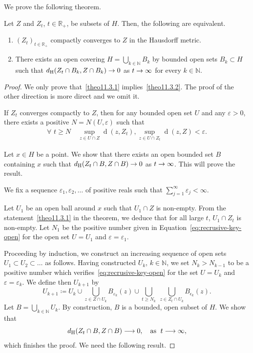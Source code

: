 \documentclass[AHL,Unicode,longabstracts]{cedram}
\DeclareMathOperator{\dist}{d}
\newcommand{\R}{\mathbb{R}}
\newcommand{\N}{\mathbb{N}}
\newcommand{\hdist}{d_{\mathrm{H}}}
\renewcommand*{\to}{\mathchoice{\longrightarrow}{\rightarrow}{\rightarrow}{\rightarrow}}
\let\oldforall\forall
\renewcommand*{\forall}{\mathrel{\oldforall}}
\begin{document}
We prove the following theorem.
\begin{theo} \label{thm:CompactHausdorffConvergence}
Let $Z$ and $Z_t$, $t\in \R_+$, be subsets of $H$. Then, the following are equivalent.
\begin{enumerate}
\item\label{theo11.3.1} $(Z_t)_{t \in \R_+}$ compactly converges to $Z$ in the Hausdorff metric.
\item\label{theo11.3.2} There exists an open covering $H = \bigcup_{k\in \N} B_k$ by bounded open sets $B_k \subset H$ such that $\hdist(Z_t \cap B_k, Z\cap B_k) \to 0$ as $t \to \infty$ for every $k \in \N$.
\end{enumerate}
\end{theo}
\begin{proof}
We only prove that~\eqref{theo11.3.1} implies~\eqref{theo11.3.2}. The proof of the other direction is more direct and we omit it.


If $Z_t$ converges compactly to $Z$, then for any bounded open set $U$ and any $\varepsilon >0$, there exists a positive $N=N(U, \varepsilon)$ such that
\begin{align}\label{eq:recrusive-key-open}
\forall \,\,t\geq N \quad \sup_{z\in U \cap Z}\dist(z, Z_t), \sup_{z\in U\cap Z_t} \dist(z, Z) < \varepsilon.
\end{align}

Let $x \in H$ be a point. We show that there exists an open bounded set $B$ containing $x$ such that $\hdist(Z_t \cap B, Z\cap B) \to 0$ as $t \to \infty$. This will prove the result.


We fix a sequence $\varepsilon_1, \varepsilon_2, \dots$ of positive reals such that $\sum_{j=1}^\infty \varepsilon_j <\infty$.


Let $U_1$ be an open ball around $x$ such that $U_1\cap Z$ is non-empty. From the statement~\eqref{theo11.3.1} in the theorem, we deduce that for all large $t$, $U_1 \cap Z_t$ is non-empty. Let $N_1$ be the positive number given in Equation~\eqref{eq:recrusive-key-open} for the open set $U=U_1$ and $\varepsilon =\varepsilon_1$.

Proceeding by induction, we construct an increasing sequence of open sets $U_1 \subset U_2 \subset \dots$ as follows. Having constructed $U_k$, $k\in \N$, we set $N_k>N_{k-1}$ to be a positive number which verifies~\eqref{eq:recrusive-key-open} for the set $U=U_k$ and $\varepsilon = \varepsilon_k$. We define then $U_{k+1}$ by
\[
U_{k+1} \coloneqq U_k \cup\bigcup_{z \in Z \cap U_k} B_{\varepsilon_k}(z) \cup \bigcup_{t\geq N_k}\; \bigcup_{z \in Z_t \cap U_k} B_{\epsilon_k}(z).
\]
Let $B = \bigcup_{k\in \N} U_k$. By construction, $B$ is a bounded, open subset of $H$. We show that
\begin{equation}\label{eq:hconverge}
\hdist(Z_t \cap B, Z\cap B) \to 0, \quad \text{as } \; t\to \infty,
\end{equation}
which finishes the proof. We need the following result.


\end{proof}
\end{document}
